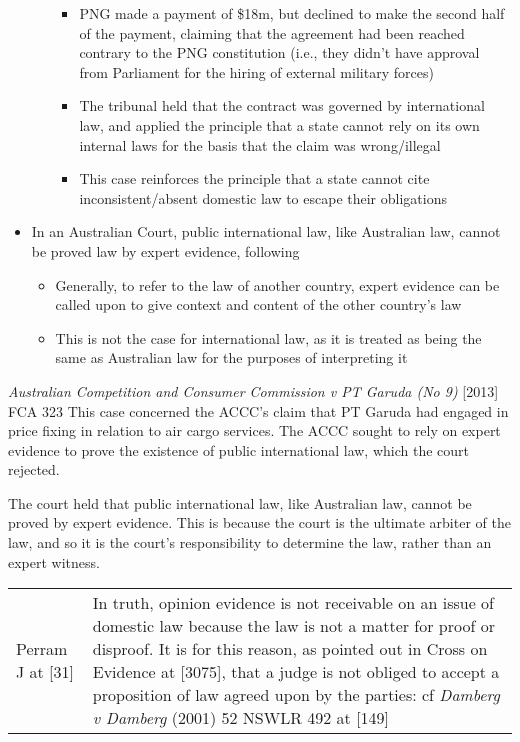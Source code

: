 \begin{itemize}
\begin{itemize}
\begin{itemize}
            \item PNG made a payment of \$18m, but declined to make the second half of the payment, claiming that the agreement had been reached contrary to the PNG constitution (i.e., they didn't have approval from Parliament for the hiring of external military forces)
            \item The tribunal held that the contract was governed by international law, and applied the principle that a state cannot rely on its own internal laws for the basis that the claim was wrong/illegal
            \item This case reinforces the principle that a state cannot cite inconsistent/absent domestic law to escape their obligations
        \end{itemize}
    \end{itemize}
    \item In an Australian Court, public international law, like Australian law, cannot be proved law by expert evidence, following 
    \begin{itemize}
        \item Generally, to refer to the law of another country, expert evidence can be called upon to give context and content of the other country's law
        \item This is not the case for international law, as it is treated as being the same as Australian law for the purposes of interpreting it
    \end{itemize}
\end{itemize}

\begin{casedetails}{\textit{Australian Competition and Consumer Commission v PT Garuda (No 9)} [2013] FCA 323}\label{case:ACCC v Garuda}
    \flushleft
    This case concerned the ACCC's claim that PT Garuda had engaged in price fixing in relation to air cargo services. The ACCC sought to rely on expert evidence to prove the existence of public international law, which the court rejected.

    \vspace{\baselineskip}

    The court held that public international law, like Australian law, cannot be proved by expert evidence. This is because the court is the ultimate arbiter of the law, and so it is the court's responsibility to determine the law, rather than an expert witness.

    \begin{longtable}{p{}|>{\raggedright\arraybackslash}p{}}
        Perram J at [31] & In truth, opinion evidence is not receivable on an issue of domestic law because the law is not a matter for proof or disproof. It is for this reason, as pointed out in Cross on Evidence at [3075], that a judge is not obliged to accept a proposition of law agreed upon by the parties: cf \textit{Damberg v Damberg} (2001) 52 NSWLR 492 at [149]
    \end{longtable}  
\end{casedetails}

